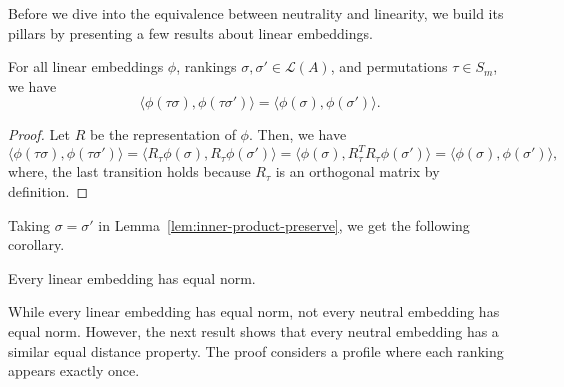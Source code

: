 \documentclass[prodmode]{acmsmall-ec14}
\newcommand{\calL}{{\mathcal{L}}}
\newcommand{\rank}{{\calL(A)}}
\begin{document}
Before we dive into the equivalence between neutrality and linearity, we build its pillars by presenting a few results about linear embeddings. 
\begin{lemma}
For all linear embeddings $\phi$, rankings $\sigma,\sigma' \in \rank$, and permutations $\tau \in S_m$, we have
$$
\langle \phi(\tau \sigma), \phi(\tau \sigma') \rangle = \langle \phi(\sigma), \phi(\sigma') \rangle.
$$
\label{lem:inner-product-preserve}
\end{lemma}
\begin{proof}
Let $R$ be the representation of $\phi$. Then, we have 
\begin{equation}
\langle \phi(\tau \sigma), \phi(\tau \sigma') \rangle = \langle R_{\tau}\phi(\sigma), R_{\tau}\phi(\sigma') \rangle = \langle \phi(\sigma), R_{\tau}^T R_{\tau}\phi(\sigma') \rangle = \langle \phi(\sigma), \phi(\sigma') \rangle,
\label{eqn:linear-inner-product}
\end{equation}
where, the last transition holds because $R_{\tau}$ is an orthogonal matrix by definition. 
\end{proof}
%
Taking $\sigma = \sigma'$ in Lemma~\ref{lem:inner-product-preserve}, we get the following corollary.
%
\begin{corollary}
Every linear embedding has equal norm.
\label{cor:linear-equal-norm}
\end{corollary}
%
While every linear embedding has equal norm, not every neutral embedding has equal norm. However, the next result shows that every neutral embedding has a similar equal distance property. The proof considers a profile where each ranking appears exactly once. 
\end{document}
